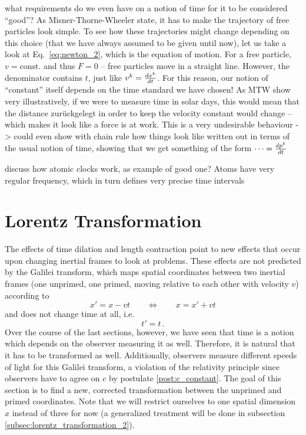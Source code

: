 \documentclass[../relativity_main.tex]{subfiles}
\begin{document}
what requirements do we even have on a notion of time for it to be considered \enquote{good}? As Misner-Thorne-Wheeler state, it has to make the trajectory of free particles look simple. To see how these trajectories might change depending on this choice (that we have always assumed to be given until now), let us take a look at Eq.~\eqref{eq:newton_2}, which is the equation of motion. For a free particle, $v = \text{const.}$ and thus $F = 0$ -- free particles move in a straight line. However, the denominator contains $t$, just like $v^k = \dv{x^k}{t}$. For this reason, our notion of \enquote{constant} itself depends on the time standard we have chosen! As MTW show very illustratively, if we were to measure time in solar days, this would mean that the distance zurückgelegt in order to keep the velocity constant would change -- which makes it look like a force is at work. This is a very undesirable behaviour -> could even show with chain rule how things look like written out in terms of the usual notion of time, showing that we get something of the form $\dots = \dv{p^k}{t}$


discuss how atomic clocks work, as example of good one? Atoms have very regular frequency, which in turn defines very precise time intervals



\newpage



	\section{Lorentz Transformation}\label{sec:lorentz_transformation_1}
The effects of time dilation and length contraction point to new effects that occur upon changing inertial frames to look at problems. These effects are not predicted by the Galilei transform, which maps spatial coordinates between two inertial frames (one unprimed, one primed, moving relative to each other with velocity $v$) according to 
\begin{equation*}
	x' = x - v t
	\qquad \Leftrightarrow \qquad
	x = x' + v t
\end{equation*}
and does not change time at all, i.e.
\begin{equation*}
	t' = t \, .
\end{equation*}
Over the course of the last sections, however, we have seen that time is a notion which depends on the observer measuring it as well. Therefore, it is natural that it has to be transformed as well. Additionally, observers measure different speeds of light for this Galilei transform, a violation of the relativity principle since observers have to agree on $c$ by postulate \ref{post:c_constant}. The goal of this section is to find a new, corrected transformation between the unprimed and primed coordinates. Note that we will restrict ourselves to one spatial dimension $x$ instead of three for now (a generalized treatment will be done in subsection \ref{subsec:lorentz_transformation_2}).\\
\end{document}
